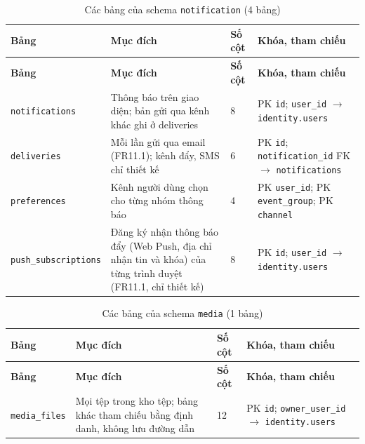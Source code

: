 \begingroup
\tblsetup\footnotesize\renewcommand{\arraystretch}{1.1}
\begin{longtable}{L{3.20cm} L{5.60cm} L{1.10cm} L{5.00cm}}
\caption{Các bảng của schema \texttt{notification} (4 bảng)}
\label{tab:db-notification} \\
\toprule
{}
\textbf{Bảng} & \textbf{Mục đích} & \textbf{Số cột} & \textbf{Khóa, tham chiếu} \\
\midrule
\endfirsthead
\toprule
{}
\textbf{Bảng} & \textbf{Mục đích} & \textbf{Số cột} & \textbf{Khóa, tham chiếu} \\
\midrule
\endhead
\bottomrule
\endfoot
\texttt{notifications} & Thông báo trên giao diện; bản gửi qua kênh khác ghi ở deliveries & 8 & PK \texttt{id}; \texttt{user\_\allowbreak{}id} $\to$ \texttt{identity.users} \\
\texttt{deliveries} & Mỗi lần gửi qua email (FR11.1); kênh đẩy, SMS chỉ thiết kế & 6 & PK \texttt{id}; \texttt{notification\_\allowbreak{}id} FK $\to$ \texttt{notifications} \\
\texttt{preferences} & Kênh người dùng chọn cho từng nhóm thông báo & 4 & PK \texttt{user\_\allowbreak{}id}; PK \texttt{event\_\allowbreak{}group}; PK \texttt{channel} \\
\texttt{push\_\allowbreak{}subscriptions} & Đăng ký nhận thông báo đẩy (Web Push, địa chỉ nhận tin và khóa) của từng trình duyệt (FR11.1, chỉ thiết kế) & 8 & PK \texttt{id}; \texttt{user\_\allowbreak{}id} $\to$ \texttt{identity.users} \\
\end{longtable}
\endgroup

\begingroup
\tblsetup\footnotesize\renewcommand{\arraystretch}{1.1}
\begin{longtable}{L{3.20cm} L{5.60cm} L{1.10cm} L{5.00cm}}
\caption{Các bảng của schema \texttt{media} (1 bảng)}
\label{tab:db-media} \\
\toprule
{}
\textbf{Bảng} & \textbf{Mục đích} & \textbf{Số cột} & \textbf{Khóa, tham chiếu} \\
\midrule
\endfirsthead
\toprule
{}
\textbf{Bảng} & \textbf{Mục đích} & \textbf{Số cột} & \textbf{Khóa, tham chiếu} \\
\midrule
\endhead
\bottomrule
\endfoot
\texttt{media\_\allowbreak{}files} & Mọi tệp trong kho tệp; bảng khác tham chiếu bằng định danh, không lưu đường dẫn & 12 & PK \texttt{id}; \texttt{owner\_\allowbreak{}user\_\allowbreak{}id} $\to$ \texttt{identity.users} \\
\end{longtable}
\endgroup

